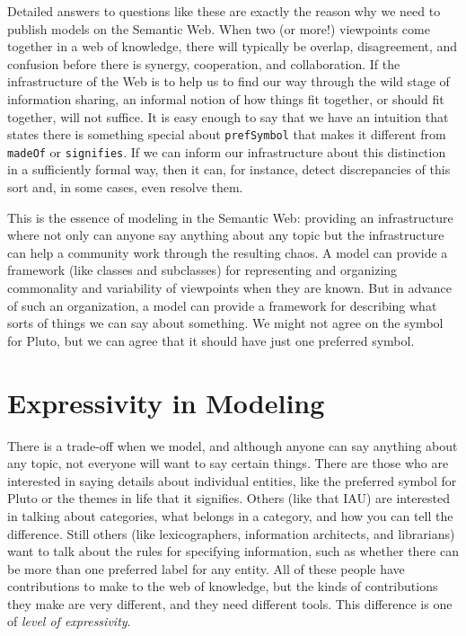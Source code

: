 Detailed answers to questions like these are exactly the reason why we
need to publish models on the Semantic Web. When two (or more!)
viewpoints come together in a web of knowledge, there will typically be
overlap, disagreement, and confusion before there is synergy,
cooperation, and collaboration. If the infrastructure of the Web is to
help us to find our way through the wild stage of information sharing,
an informal notion of how things fit together, or should fit together,
will not suffice. It is easy enough to say that we have an intuition
that states there is something special about \texttt{prefSymbol} that makes it
different from \texttt{madeOf} or \texttt{signifies}. If we can inform our 
infrastructure about this distinction in a sufficiently formal way, then it
can, for instance, detect discrepancies of this sort and, in some cases,
even resolve them.

This is the essence of modeling in the Semantic Web: providing an
infrastructure where not only can anyone say anything about any topic
but the infrastructure can help a community work through the resulting
chaos. A model can provide a framework (like classes and subclasses) for
representing and organizing commonality and variability of viewpoints
when they are known. But in advance of such an organization, a model can
provide a framework for describing what sorts of things we can say about
something. We might not agree on the symbol for Pluto, but we can agree
that it should have just one preferred symbol.

\section{Expressivity in Modeling}

There is a trade-off when we model, and although anyone can say anything
about any topic, not everyone will want to say certain things. There are
those who are interested in saying details about individual entities,
like the preferred symbol for Pluto or the themes in life that it
signifies. Others (like that IAU) are interested in talking about
categories, what belongs in a category, and how you can tell the
difference. Still others (like lexicographers, information architects,
and librarians) want to talk about the rules for specifying information,
such as whether there can be more than one preferred label for any
entity. All of these people have contributions to make to the web of
knowledge, but the kinds of contributions they make are very different,
and they need different tools. This difference is one of \emph{level of
expressivity}.

